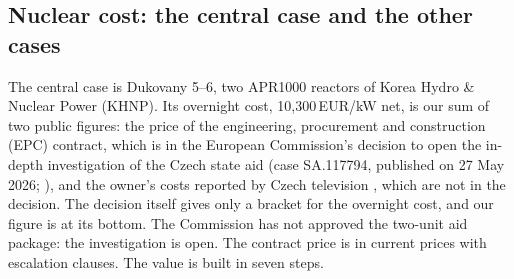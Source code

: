 \subsection{Nuclear cost: the central case and the other cases}\label{sec:nuclear}
The central case is Dukovany 5--6, two APR1000 reactors of Korea Hydro \& Nuclear Power (KHNP). Its overnight cost, 10{,}300\,EUR/kW net, is our sum of two public figures: the price of the engineering, procurement and construction (EPC) contract, which is in the European Commission's decision to open the in-depth investigation of the Czech state aid (case SA.117794, published on 27 May 2026; \citealp{ECDukovany2026}), and the owner's costs reported by Czech television \citep{CT24Dukovany}, which are not in the decision. The decision itself gives only a bracket for the overnight cost, and our figure is at its bottom. The Commission has not approved the two-unit aid package: the investigation is open. The contract price is in current prices with escalation clauses. The value is built in seven steps.
